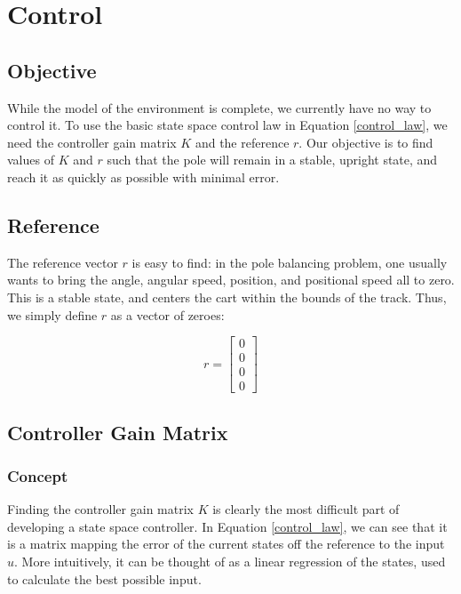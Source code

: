 \documentclass[12pt]{article}
\begin{document}
\section{Control}

\subsection{Objective}

While the model of the environment is complete, we currently have no way to control it. To use the basic state space control law in Equation \ref{control_law}, we need the controller gain matrix $K$ and the reference $r$. Our objective is to find values of $K$ and $r$ such that the pole will remain in a stable, upright state, and reach it as quickly as possible with minimal error.

\subsection{Reference}

The reference vector $r$ is easy to find: in the pole balancing problem, one usually wants to bring the angle, angular speed, position, and positional speed all to zero. This is a stable state, and centers the cart within the bounds of the track. Thus, we simply define $r$ as a vector of zeroes:

\begin{equation}
    \displaystyle
    r = \begin{bmatrix}
        0 \\
        0 \\
        0 \\
        0
    \end{bmatrix}
\end{equation}

\subsection{Controller Gain Matrix}

\subsubsection{Concept}

Finding the controller gain matrix $K$ is clearly the most difficult part of developing a state space controller. In Equation \ref{control_law}, we can see that it is a matrix mapping the error of the current states off the reference to the input $u$. More intuitively, it can be thought of as a linear regression of the states, used to calculate the best possible input.
\end{document}
